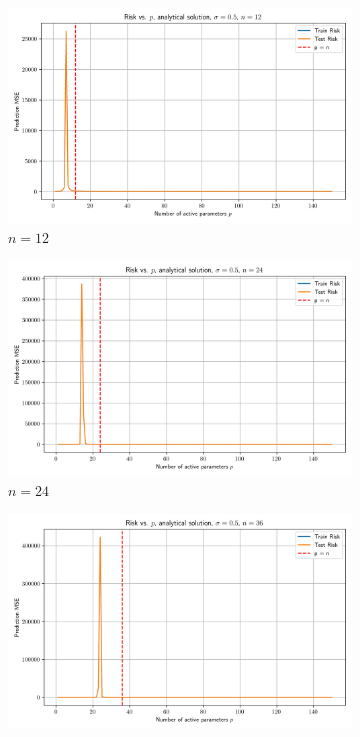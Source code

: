 \documentclass[twoside,10pt]{article}
\begin{document}
\begin{figure}[htb]
  \centering
  \newcommand{\imgwidth}{0.22\textwidth}

  \begin{subfigure}[b]{\imgwidth}
    \includegraphics[width=\linewidth]{img2/risk_curve_n12.png}
    \caption{$n=12$}\label{fig:2a}
  \end{subfigure}%
  \hfill
  \begin{subfigure}[b]{\imgwidth}
    \includegraphics[width=\linewidth]{img2/risk_curve_n24.png}
    \caption{$n=24$}\label{fig:2b}
  \end{subfigure}%
  \hfill
  \begin{subfigure}[b]{\imgwidth}
    \includegraphics[width=\linewidth]{img2/risk_curve_n36.png}

\end{subfigure}
\end{figure}
\end{document}
